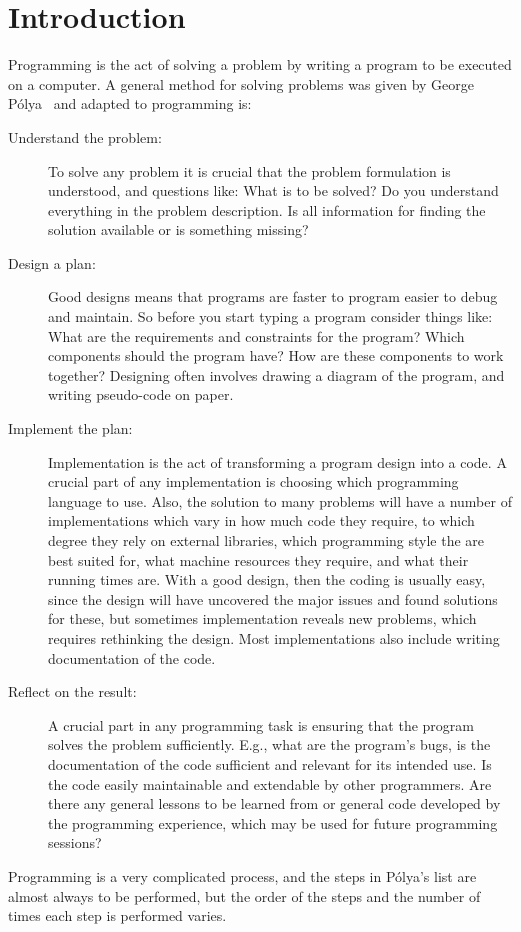 \chapter{Introduction}

Programming is the act of solving a problem by writing a program to be executed on a computer. A general method for solving problems was given by George Pólya~\cite{polya45} and adapted to programming is:
\begin{description}
\item[Understand the problem:] To solve any problem it is crucial that the problem formulation is understood, and questions like: What is to be solved? Do you understand everything in the problem description. Is all information for finding the solution available or is something missing?
\item[Design a plan:] Good designs means that programs are faster to program easier to debug and maintain. So before you start typing a program consider things like: What are the requirements and constraints for the program? Which components should the program have? How are these components to work together? Designing often involves drawing a diagram of the program, and writing pseudo-code on paper.
\item[Implement the plan:] Implementation is the act of transforming a program design into a code. A crucial part of any implementation is choosing which programming language to use. Also, the solution to many problems will have a number of implementations which vary in how much code they require, to which degree they rely on external libraries, which programming style the are best suited for, what machine resources they require, and what their running times are.  With a good design, then the coding is usually easy, since the design will have uncovered the major issues and found solutions for these, but sometimes implementation reveals new problems, which requires rethinking the design. Most implementations also include writing documentation of the code.
\item[Reflect on the result:] A crucial part in any programming task is ensuring that the program solves the problem sufficiently. E.g., what are the program's bugs, is the documentation of the code sufficient and relevant for its intended use. Is the code easily maintainable and extendable by other programmers. Are there any general lessons to be learned from or general code developed by the programming experience, which may be used for future programming sessions?
\end{description}
Programming is a very complicated process, and the steps in Pólya's list are almost always to be performed, but the order of the steps and the number of times each step is performed varies. 

